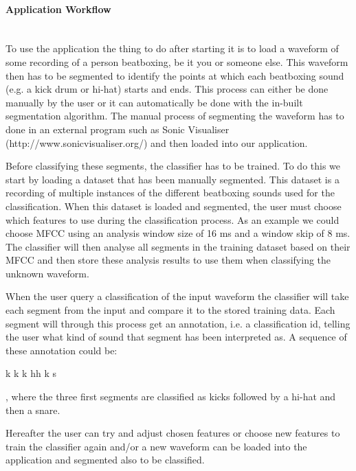 \paragraph{Application Workflow} \hspace{0pt} \\
To use the application the thing to do after starting it is to load a waveform of some recording of a person beatboxing, be it you or someone else. This waveform then has to be segmented to identify the points at which each beatboxing sound (e.g. a kick drum or hi-hat) starts and ends. This process can either be done manually by the user or it can automatically be done with the in-built segmentation algorithm. The manual process of segmenting the waveform has to done in an external program such as Sonic Visualiser (http://www.sonicvisualiser.org/) and then loaded into our application.

Before classifying these segments, the classifier has to be trained. To do this we start by loading a dataset that has been manually segmented. This dataset is a recording of multiple instances of the different beatboxing sounds used for the classification. When this dataset is loaded and segmented, the user must choose which features to use during the classification process. As an example we could choose MFCC using an analysis window size of 16 ms and a window skip of 8 ms. The classifier will then analyse all segments in the training dataset based on their MFCC and then store these analysis results to use them when classifying the unknown waveform.

When the user query a classification of the input waveform the classifier will take each segment from the input and compare it to the stored training data. Each segment will through this process get an annotation, i.e. a classification id, telling the user what kind of sound that segment has been interpreted as. A sequence of these annotation could be:

\begin{center}
k k k hh k s
\end{center}

, where the three first segments are classified as kicks followed by a hi-hat and then a snare.

Hereafter the user can try and adjust chosen features or choose new features to train the classifier again and/or a new waveform can be loaded into the application and segmented also to be classified.